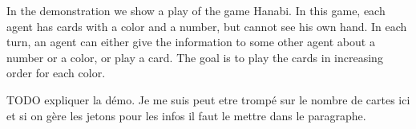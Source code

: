 In the demonstration we show a play of the game Hanabi. In this game, each agent has cards with a color and a number, but cannot see his own hand. In each turn, an agent can either give the information to some other agent about a number or a color, or play a card. The goal is to play the cards in increasing order for each color.

TODO expliquer la démo. Je me suis peut etre trompé sur le nombre de cartes ici et si on gère les jetons pour les infos il faut le mettre dans le paragraphe.